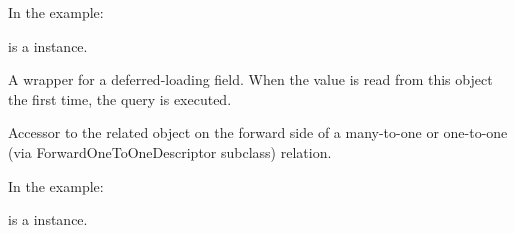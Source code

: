 \documentclass[letterpaper,10pt,english]{sphinxmanual}
\begin{document}
\begin{fulllineitems}
\begin{fulllineitems}
In the example:

%
\begin{sphinxVerbatim}[commandchars=\\\{\}]
 
       
\end{sphinxVerbatim}

 is a  instance.

\end{fulllineitems}


\begin{fulllineitems}
\label{\detokenize{QuChemPedIA.models:QuChemPedIA.models.ImportFileModels.ImportFile.id_software_id}}
A wrapper for a deferred-loading field. When the value is read from this
object the first time, the query is executed.

\end{fulllineitems}


\begin{fulllineitems}
\label{\detokenize{QuChemPedIA.models:QuChemPedIA.models.ImportFileModels.ImportFile.id_user}}
Accessor to the related object on the forward side of a many-to-one or
one-to-one (via ForwardOneToOneDescriptor subclass) relation.

In the example:

%
\begin{sphinxVerbatim}[commandchars=\\\{\}]
 
       
\end{sphinxVerbatim}

 is a  instance.


\end{fulllineitems}
\end{fulllineitems}
\end{document}
